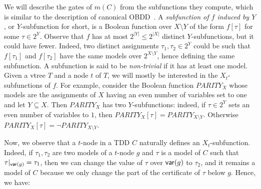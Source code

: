 \documentclass[a4paper,UKenglish,cleveref, autoref, thm-restate]{lipics-v2021}
\newcommand{\guy}[1]{\todo[color=purple]{\color{white}{{\bf Guy}: #1}}}
\begin{document}
We will describe the gates of $m(C)$ from the subfunctions they compute, which is similar to the description of canonical OBDD~\cite{sieling1993nc}.  A \emph{subfunction  of $f$ induced by $Y$},
or $Y$-subfunction for short, is a Boolean function over $X \setminus Y$ of the form $f[\tau]$ for some $\tau \in 2^{Y}$. Observe that $f$ has at most $2^{|Y|} \leq 2^{|X|}$ distinct $Y$-subfunctions, but it could have fewer. Indeed, two distinct assignments $\tau_1,\tau_2 \in 2^{Y}$ could be such that $f[\tau_1]$ and $f[\tau_2]$ have the same models over $2^{X \setminus Y}$, hence defining the same subfunction. A subfunction is said to be \emph{non-trivial} if it has at least one model. Given a vtree $T$ and a node $t$ of $T$, we will mostly be interested in the $X_t$-subfunctions of $f$. For example, consider the Boolean function $\mathit{PARITY}_X$ whose models are the assignments of $X$ having an even number of variables set to one and let $Y \subseteq X$. Then $\mathit{PARITY}_X$ has two $Y$-subfunctions: indeed, if $\tau \in 2^Y$ sets an even number of variables to $1$, then $\mathit{PARITY}_{X}[\tau] = \mathit{PARITY}_{X \setminus Y}$. Otherwise $\mathit{PARITY}_{X}[\tau] = \neg \mathit{PARITY}_{X \setminus Y}$. 


Now, we observe that a $t$-node in a TDD $C$ naturally defines an $X_t$-subfunction. Indeed, if $\tau_1,\tau_2$ are two models of a $t$-node $g$ and $\tau$ is a model of $C$ such that $\tau|_{\mathsf{var}(g)} = \tau_1$, then we can change the value of $\tau$ over $\mathsf{var}(g)$ to $\tau_2$, and it remains a model of $C$ because we only change the part of the certificate of $\tau$ below $g$. Hence, we have:
\end{document}
